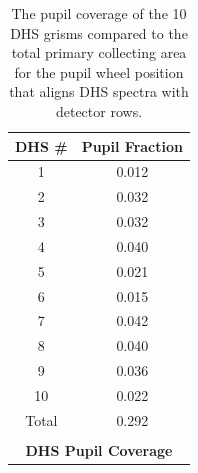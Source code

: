 \documentclass[iop]{emulateapj}
\begin{document}
\begin{table}[!ht]
\centering
\begin{tabular}{cc}
\hline \hline
DHS \# & Pupil Fraction \\
\hline \hline
1  & 0.012 \\
2  & 0.032 \\
3  & 0.032 \\
4  & 0.040 \\
5  & 0.021 \\
6  & 0.015 \\
7  & 0.042 \\
8  & 0.040 \\
9  & 0.036 \\
10 & 0.022 \\
\hline
Total & 0.292\\
\hline
\\
\multicolumn{2}{c}{\textbf{DHS Pupil Coverage} }
\end{tabular}
\caption{The pupil coverage of the 10 DHS grisms compared to the total primary collecting area for the pupil wheel position that aligns DHS spectra with detector rows.}
\label{tab:pupfrac}
\end{table}





\end{document}
